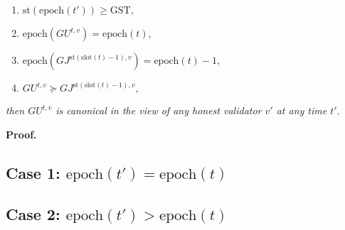 \documentclass{article}
\begin{document}
\begin{enumerate}
    \item $\text{st}(\text{epoch}(t')) \geq \text{GST},$
    \item $\text{epoch}(GU^{t,v}) = \text{epoch}(t),$
    \item $\text{epoch}(GJ^{\text{st}(\text{slot}(t)-1),v}) = \text{epoch}(t) - 1,$
    \item $GU^{t,v} \succeq GJ^{\text{st}(\text{slot}(t)-1),v},$
\end{enumerate}

\textit{then $GU^{t,v}$ is canonical in the view of any honest validator $v'$ at any time $t'$.}

\textbf{Proof.}

\subsection*{Case 1: $\text{epoch}(t') = \text{epoch}(t)$}

\subsection*{Case 2: $\text{epoch}(t') > \text{epoch}(t)$}
\end{document}

